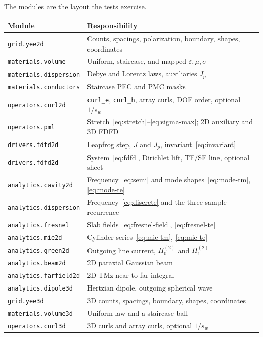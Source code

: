 \documentclass[11pt,a4paper]{article}
\numberwithin{equation}{section}
\begin{document}
The modules are the layout the tests exercise.

\begin{center}
\begin{tabular}{@{}ll@{}}
\toprule
Module & Responsibility\\
\midrule
\texttt{grid.yee2d} & Counts, spacings, polarization, boundary, shapes, coordinates\\
\texttt{materials.volume} & Uniform, staircase, and mapped $\varepsilon,\mu,\sigma$\\
\texttt{materials.dispersion} & Debye and Lorentz laws, auxiliaries $J_p$\\
\texttt{materials.conductors} & Staircase PEC and PMC masks\\
\texttt{operators.curl2d} & \texttt{curl\_e}, \texttt{curl\_h}, array curls, DOF order, optional $1/s_w$\\
\texttt{operators.pml} & Stretch~\eqref{eq:stretch}--\eqref{eq:sigma-max}; 2D auxiliary and 3D FDFD\\
\texttt{drivers.fdtd2d} & Leapfrog step, $J$ and $J_p$, invariant~\eqref{eq:invariant}\\
\texttt{drivers.fdfd2d} & System~\eqref{eq:fdfd}, Dirichlet lift, TF/SF line, optional sheet\\
\texttt{analytics.cavity2d} & Frequency~\eqref{eq:semi} and mode shapes~\eqref{eq:mode-tm}, \eqref{eq:mode-te}\\
\texttt{analytics.dispersion} & Frequency~\eqref{eq:discrete} and the three-sample recurrence\\
\texttt{analytics.fresnel} & Slab fields~\eqref{eq:fresnel-field}, \eqref{eq:fresnel-te}\\
\texttt{analytics.mie2d} & Cylinder series~\eqref{eq:mie-tm}, \eqref{eq:mie-te}\\
\texttt{analytics.green2d} & Outgoing line current, $H_0^{(2)}$ and $H_1^{(2)}$\\
\texttt{analytics.beam2d} & 2D paraxial Gaussian beam\\
\texttt{analytics.farfield2d} & 2D TMz near-to-far integral\\
\texttt{analytics.dipole3d} & Hertzian dipole, outgoing spherical wave\\
\texttt{grid.yee3d} & 3D counts, spacings, boundary, shapes, coordinates\\
\texttt{materials.volume3d} & Uniform law and a staircase ball\\
\texttt{operators.curl3d} & 3D curls and array curls, optional $1/s_w$\\

\end{tabular}
\end{center}
\end{document}
